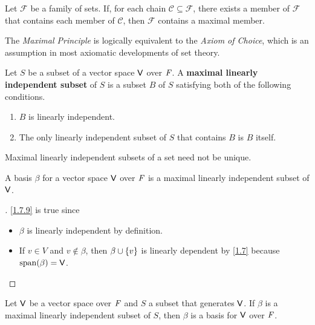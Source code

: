\begin{ax}\label{1.7.7}
  Let \(\mathcal{F}\) be a family of sets.
  If, for each chain \(\mathcal{C} \subseteq \mathcal{F}\), there exists a member of \(\mathcal{F}\) that contains each member of \(\mathcal{C}\), then \(\mathcal{F}\) contains a maximal member.
\end{ax}

\begin{note}
  The \emph{Maximal Principle} is logically equivalent to the \emph{Axiom of Choice}, which is an assumption in most axiomatic developments of set theory.
\end{note}

\begin{defn}\label{1.7.8}
  Let \(S\) be a subset of a vector space \(\mathsf{V}\) over \(\mathit{F}\).
  A \textbf{maximal linearly independent subset} of \(S\) is a subset \(B\) of \(S\) satisfying both of the following conditions.
  \begin{enumerate}
    \item \(B\) is linearly independent.
    \item The only linearly independent subset of \(S\) that contains \(B\) is \(B\) itself.
  \end{enumerate}
\end{defn}

\begin{note}
  Maximal linearly independent subsets of a set need not be unique.
\end{note}

\begin{eg}\label{1.7.9}
  A basis \(\beta\) for a vector space \(\mathsf{V}\) over \(\mathit{F}\) is a maximal linearly independent subset of \(\mathsf{V}\).
\end{eg}

\begin{proof}[]
  \cref{1.7.9} is true since
  \begin{itemize}
    \item \(\beta\) is linearly independent by definition.
    \item If \(v \in V\) and \(v \notin \beta\), then \(\beta \cup \left\lbrace v\right\rbrace\) is linearly dependent by \cref{1.7} because \(\spn{\beta} = \V\).
  \end{itemize}
\end{proof}

\begin{thm}\label{1.12}
  Let \(\mathsf{V}\) be a vector space over \(\mathit{F}\) and \(S\) a subset that generates \(\mathsf{V}\).
  If \(\beta\) is a maximal linearly independent subset of \(S\), then \(\beta\) is a basis for \(\mathsf{V}\) over \(\mathit{F}\).
\end{thm}

